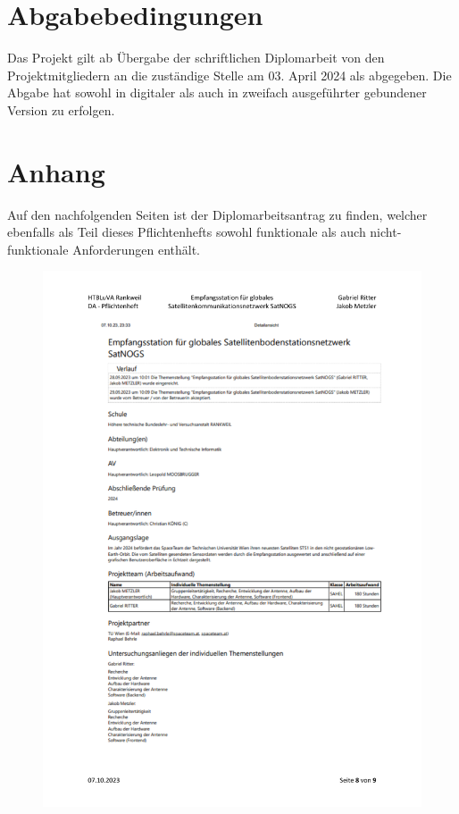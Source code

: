 \section{Abgabebedingungen}
Das Projekt gilt ab Übergabe der schriftlichen Diplomarbeit von den Projektmitgliedern an die 
zuständige Stelle am 03. April 2024 als abgegeben. Die Abgabe hat sowohl in digitaler als auch in 
zweifach ausgeführter gebundener Version zu erfolgen. 

\section{Anhang}
Auf den nachfolgenden Seiten ist der Diplomarbeitsantrag zu finden, welcher ebenfalls als Teil dieses 
Pflichtenhefts sowohl funktionale als auch nicht-funktionale Anforderungen enthält.
\newpage

\begin{figure}
	\centering
	\includegraphics[width=\textwidth]{../ref/DA_Metzler_Ritter_Pflichtenheft_v1.2-page8.pdf}
\end{figure}



